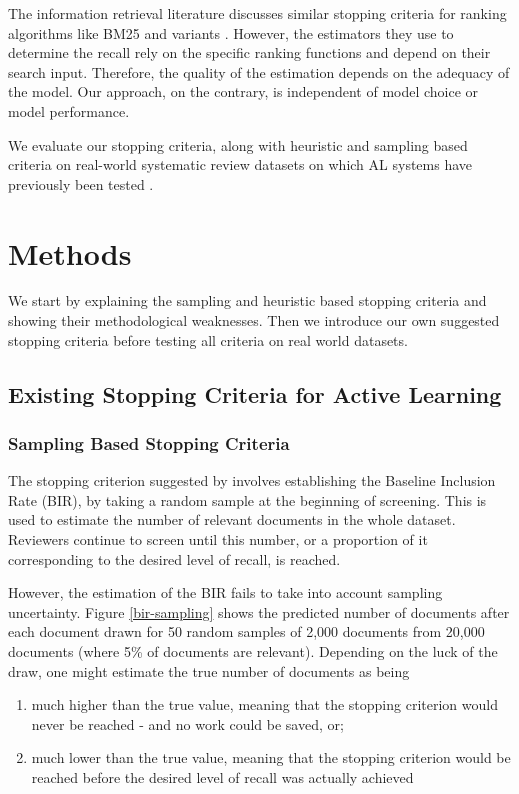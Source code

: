\documentclass{bmcart}
\begin{document}
	The information retrieval literature discusses similar stopping criteria for ranking algorithms like BM25 and variants \cite{DiNunzio2018, Yu2019}. However, the estimators they use to determine the recall rely on the specific ranking functions and depend on their search input. Therefore, the quality of the estimation depends on the adequacy of the model. Our approach, on the contrary, is independent of model choice or model performance. 
	
	We evaluate our stopping criteria, along with heuristic and sampling based criteria on real-world systematic review datasets on which AL systems have previously been tested \cite{Cohen2006, Yu2019, Terasawa2009, Castaldi2009}.
	
	\section*{Methods}

	We start by explaining the sampling and heuristic based stopping criteria and showing their methodological weaknesses. 
Then we introduce our own suggested stopping criteria before testing all criteria on real world datasets.
	
	\subsection*{Existing Stopping Criteria for Active Learning}

	
	\subsubsection*{Sampling Based Stopping Criteria}
	
	The stopping criterion suggested by \cite{Shemilt2014} involves establishing the Baseline Inclusion Rate (BIR), by taking a random sample at the beginning of screening. 
	This is used to estimate the number of relevant documents in the whole dataset. 
	Reviewers continue to screen until this number, or a proportion of it corresponding to the desired level of recall, is reached.
	

	
	However, the estimation of the BIR fails to take into account sampling uncertainty. 
	Figure \ref{bir-sampling} shows the predicted number of documents after each document drawn for 50 random samples of 2,000 documents from 20,000 documents (where 5\% of documents are relevant). 
	Depending on the luck of the draw, one might estimate the true number of documents as being
	\begin{enumerate}
		\item much higher than the true value, meaning that the stopping criterion would never be reached - and no work could be saved, or;
		\item much lower than the true value, meaning that the stopping criterion would be reached before the desired level of recall was actually achieved
	\end{enumerate}
	
\end{document}
